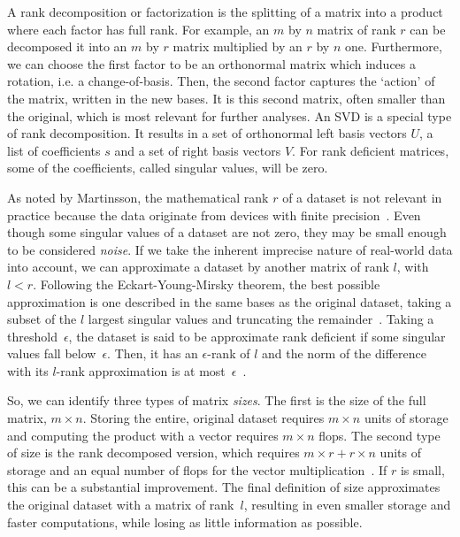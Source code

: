 \documentclass[ijgi,article,submit,moreauthors,pdftex,10pt,a4paper]{Definitions/mdpi}
\begin{document}
A rank decomposition or factorization is the splitting of a matrix into a product where each factor has full rank. For example, an $m$ by $n$ matrix of rank $r$ can be decomposed it into an $m$ by $r$ matrix multiplied by an $r$ by $n$ one. Furthermore, we can choose the first factor to be an orthonormal matrix which induces a rotation, i.e. a change-of-basis. Then, the second factor captures the `action' of the matrix, written in the new bases. It is this second matrix, often smaller than the original, which is most relevant for further analyses. An SVD is a special type of rank decomposition. It results in a set of orthonormal left basis vectors $U$, a list of coefficients $s$ and a set of right basis vectors $V$. For rank deficient matrices, some of the coefficients, called singular values, will be zero.

As noted by Martinsson, the mathematical rank $r$ of a dataset is not relevant in practice because the data originate from devices with finite precision~\cite{Martinsson2016}. Even though some singular values of a dataset are not zero, they may be small enough to be considered \textit{noise}. If we take the inherent imprecise nature of real-world data into account, we can approximate a dataset by another matrix of rank $l$, with $l < r$. Following the Eckart-Young-Mirsky theorem, the best possible approximation is one described in the same bases as the original dataset, taking a subset of the $l$ largest singular values and truncating the remainder~\cite{Eckart1936}. Taking a threshold~$\epsilon$, the dataset is said to be approximate rank deficient if some singular values fall below~$\epsilon$. Then, it has an $\epsilon$-rank of $l$ and the norm of the difference with its $l$-rank approximation is at most~$\epsilon$~\cite{Martinsson2016}.

So, we can identify three types of matrix \textit{sizes}. The first is the size of the full matrix, $m \times n$. Storing the entire, original dataset requires $m \times n$ units of storage and computing the product with a vector requires $m \times n$ flops. The second type of size is the rank decomposed version, which  requires $m \times r + r \times n$ units of storage and an equal number of flops for the vector multiplication~\cite{Martinsson2016}. If $r$ is small, this can be a substantial improvement. The final definition of size approximates the original dataset with a matrix of rank~$l$, resulting in even smaller storage and faster computations, while losing as little information as possible.
\end{document}
